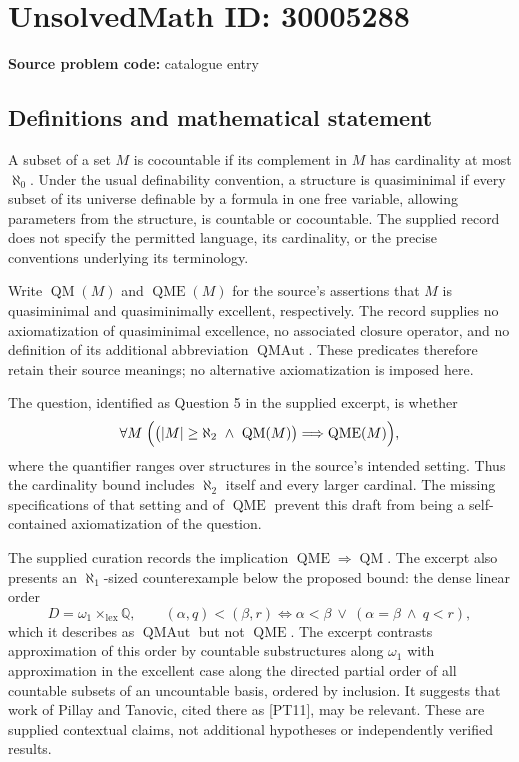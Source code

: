 \documentclass[11pt]{article}
\newcommand{\Q}{\mathbb{Q}}
\begin{document}
\section*{UnsolvedMath ID: 30005288}
\textbf{Source problem code:} catalogue entry
\subsection{Definitions and mathematical statement}
A subset of a set \(M\) is cocountable if its complement in \(M\) has cardinality at most \(\aleph_0\). Under the usual definability convention, a structure is quasiminimal if every subset of its universe definable by a formula in one free variable, allowing parameters from the structure, is countable or cocountable. The supplied record does not specify the permitted language, its cardinality, or the precise conventions underlying its terminology.

Write \(\operatorname{QM}(M)\) and \(\operatorname{QME}(M)\) for the source's assertions that \(M\) is quasiminimal and quasiminimally excellent, respectively. The record supplies no axiomatization of quasiminimal excellence, no associated closure operator, and no definition of its additional abbreviation \(\operatorname{QMAut}\). These predicates therefore retain their source meanings; no alternative axiomatization is imposed here.

The question, identified as Question 5 in the supplied excerpt, is whether
\[
\forall M\;\Bigl(\bigl(|M|\geq\aleph_2\ \land\ \operatorname{QM}(M)\bigr)
\Longrightarrow \operatorname{QME}(M)\Bigr),
\]
where the quantifier ranges over structures in the source's intended setting. Thus the cardinality bound includes \(\aleph_2\) itself and every larger cardinal. The missing specifications of that setting and of \(\operatorname{QME}\) prevent this draft from being a self-contained axiomatization of the question.

The supplied curation records the implication \(\operatorname{QME}\Rightarrow\operatorname{QM}\). The excerpt also presents an \(\aleph_1\)-sized counterexample below the proposed bound: the dense linear order
\[
D=\omega_1\times_{\mathrm{lex}}\Q,
\qquad
(\alpha,q)<(\beta,r)
\iff \alpha<\beta\ \lor\ (\alpha=\beta\ \land\ q<r),
\]
which it describes as \(\operatorname{QMAut}\) but not \(\operatorname{QME}\). The excerpt contrasts approximation of this order by countable substructures along \(\omega_1\) with approximation in the excellent case along the directed partial order of all countable subsets of an uncountable basis, ordered by inclusion. It suggests that work of Pillay and Tanovic, cited there as [PT11], may be relevant. These are supplied contextual claims, not additional hypotheses or independently verified results.
\end{document}
